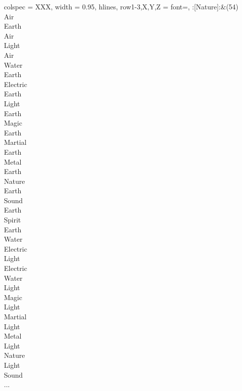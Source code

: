 \begin{longtblr}[
	caption = {2v1 Defending Weak},
	label = {2v1-Defending-Weak},
]{
	colspec = {XXX}, width = 0.95\linewidth,
	hlines,
	row{1-3,X,Y,Z} = {font=\bfseries},
}
	:[Nature]:&{(54)\\
	Air \\
	Earth \\
	Air \\
	Light \\
	Air \\
	Water \\
	Earth \\
	Electric \\
	Earth \\
	Light \\
	Earth \\
	Magic \\
	Earth \\
	Martial \\
	Earth \\
	Metal \\
	Earth \\
	Nature \\
	Earth \\
	Sound \\
	Earth \\
	Spirit \\
	Earth \\
	Water \\
	Electric \\
	Light \\
	Electric \\
	Water \\
	Light \\
	Magic \\
	Light \\
	Martial \\
	Light \\
	Metal \\
	Light \\
	Nature \\
	Light \\
	Sound \\
	...\\
	}\\


\end{longtblr}
